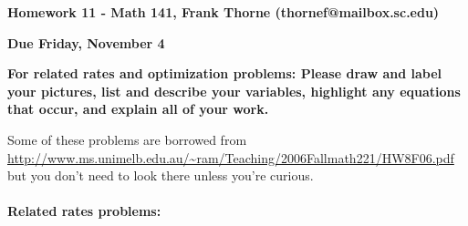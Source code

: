 \documentclass[12pt]{article}
\begin{document}
\setlength{\topmargin}{-2mm}





\begin{center}{\bf Homework 11 - Math 141, Frank Thorne (thornef@mailbox.sc.edu)}
\end{center}
\begin{center}
{\bf Due Friday, November 4}
\end{center}

{\bf For related rates and optimization problems: Please draw and label your
pictures, list and describe your variables, highlight any equations that occur, and explain all of your
work.}

Some of these problems are borrowed from
\url{http://www.ms.unimelb.edu.au/~ram/Teaching/2006Fallmath221/HW8F06.pdf}
but you don't need to look there unless you're curious. 
\\
\\
{\bf Related rates problems:}
\end{document}
